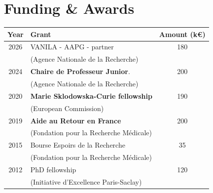 \section{Funding \& Awards}

\begin{center}
\begin{tabular}{clc}

     \hline
    \textbf{Year} & \textbf{Grant}                                  & \textbf{Amount (k\euro{})} \\[.1cm]
     \hline
    2026 & VANILA - AAPG - partner                &     180   \\
         & (Agence Nationale de la Recherche)     &             \\
     \hline
    2024 & \textbf{Chaire de Professeur Junior}.       & 200         \\
         & (Agence Nationale de la Recherche)     &             \\
     \hline
    2020 & \textbf{Marie Sklodowska-Curie fellowship}  & 190         \\
         & (European Commission)                  &             \\
     \hline
    2019 & \textbf{Aide au Retour en France}           & 200         \\
         & (Fondation pour la Recherche Médicale) &             \\
     \hline
    2015 & Bourse Espoirs de la Recherche         & 35          \\
         & (Fondation pour la Recherche Médicale) &             \\
     \hline
    2012 & PhD fellowship                         & 120         \\
         & (Initiative d'Excellence Paris-Saclay) &             \\
     \hline

\end{tabular}
\end{center}

